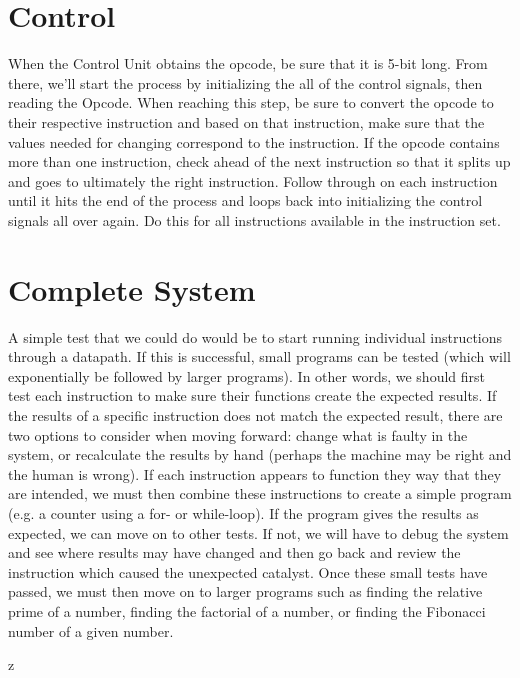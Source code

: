 \documentclass[12pt, a4paper]{report}
\begin{document}
	\section{Control}
	When the Control Unit obtains the opcode, be sure that it is 5-bit long. From there, we’ll start the process by initializing the all of the control signals, then reading the Opcode. When reaching this step, be sure to convert the opcode to their respective instruction and based on that instruction, make sure that the values needed for changing correspond to the instruction. If the opcode contains more than one instruction, check ahead of the next instruction so that it splits up and goes to ultimately the right instruction. Follow through on each instruction until it hits the end of the process and loops back into initializing the control signals all over again. Do this for all instructions available in the instruction set.

	\section{Complete System}
	A simple test that we could do would be to start running individual instructions through a datapath. If this is successful, small programs can be tested (which will exponentially be followed by larger programs).
	In other words, we should first test each instruction to make sure their functions create the expected results.  If the results of a specific instruction does not match the expected result, there are two options to consider when moving forward: change what is faulty in the system, or recalculate the results by hand (perhaps the machine may be right and the human is wrong).
	If each instruction appears to function they way that they are intended, we must then combine these instructions to create a simple program (e.g. a counter using a for- or while-loop).  If the program gives the results as expected, we can move on to other tests.  If not, we will have to debug the system and see where results may have changed and then go back and review the instruction which caused the unexpected catalyst.
	Once these small tests have passed, we must then move on to larger programs such as finding the relative prime of a number, finding the factorial of a number, or finding the Fibonacci number of a given number.
		

	\lstMakeShortInline[language={[MERC16]Assembler}]z
\end{document}
